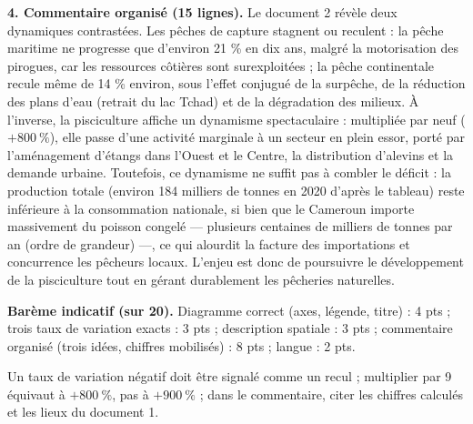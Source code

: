 \documentclass[11pt]{article}
\begin{document}
\begin{corrige}
\textbf{4. Commentaire organisé (15 lignes).} Le document 2 révèle deux dynamiques contrastées. Les pêches de capture stagnent ou reculent : la pêche maritime ne progresse que d'environ 21 \% en dix ans, malgré la motorisation des pirogues, car les ressources côtières sont surexploitées ; la pêche continentale recule même de 14 \% environ, sous l'effet conjugué de la surpêche, de la réduction des plans d'eau (retrait du lac Tchad) et de la dégradation des milieux. À l'inverse, la pisciculture affiche un dynamisme spectaculaire : multipliée par neuf ($+800\ \%$), elle passe d'une activité marginale à un secteur en plein essor, porté par l'aménagement d'étangs dans l'Ouest et le Centre, la distribution d'alevins et la demande urbaine. Toutefois, ce dynamisme ne suffit pas à combler le déficit : la production totale (environ 184 milliers de tonnes en 2020 d'après le tableau) reste inférieure à la consommation nationale, si bien que le Cameroun importe massivement du poisson congelé — plusieurs centaines de milliers de tonnes par an (ordre de grandeur) —, ce qui alourdit la facture des importations et concurrence les pêcheurs locaux. L'enjeu est donc de poursuivre le développement de la pisciculture tout en gérant durablement les pêcheries naturelles.

\textbf{Barème indicatif (sur 20).} Diagramme correct (axes, légende, titre) : 4 pts ; trois taux de variation exacts : 3 pts ; description spatiale : 3 pts ; commentaire organisé (trois idées, chiffres mobilisés) : 8 pts ; langue : 2 pts.

\begin{attention}
Un taux de variation négatif doit être signalé comme un recul ; multiplier par 9 équivaut à $+800\ \%$, pas à $+900\ \%$ ; dans le commentaire, citer les chiffres calculés et les lieux du document 1.
\end{attention}
\end{corrige}
\end{document}
